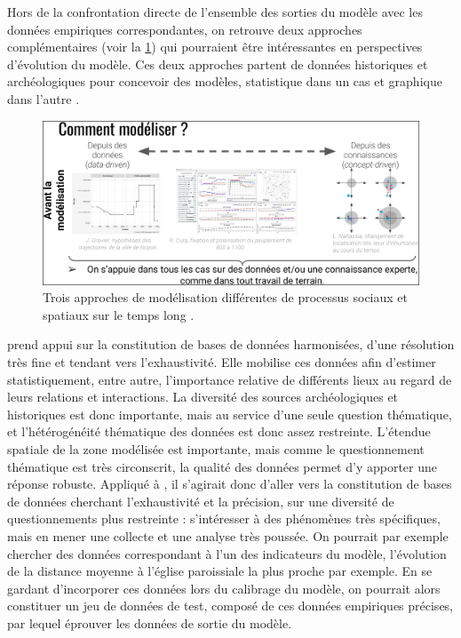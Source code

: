 \noindent Hors de la confrontation directe de l'ensemble des sorties du modèle avec les données empiriques correspondantes, on retrouve deux approches complémentaires (voir la \cref{fig:JIG}) qui pourraient être intéressantes en perspectives d'évolution du modèle.
Ces deux approches partent de données historiques et archéologiques pour concevoir des modèles, statistique dans un cas \autocite{gravier_deux_2018} et graphique dans l'autre \autocite{nahassia_formes_2019}.

\begin{figure}[H]
	\centering
	\includegraphics[width=\linewidth]{img/types_modelisation_JIG.png}
	
	\caption[Trois approches de modélisation différentes de processus sociaux et spatiaux sur le temps long.]{Trois approches de modélisation différentes de processus sociaux et spatiaux sur le temps long \autocite{cura:halshs-02296147}.}
	\label{fig:JIG}
\end{figure}

\noindent \textcite{gravier_deux_2018} prend appui sur la constitution de bases de données harmonisées, d'une résolution très fine et tendant vers l'exhaustivité.
Elle mobilise ces données afin d'estimer statistiquement, entre autre, l'importance relative de différents lieux au regard de leurs relations et interactions.
La diversité des sources archéologiques et historiques est donc importante, mais au service d'une seule question thématique, et l'hétérogénéité thématique des données est donc assez restreinte.
L'étendue spatiale de la zone modélisée est importante, mais comme le questionnement thématique est très circonscrit, la qualité des données permet d'y apporter une réponse robuste.
Appliqué à \simfeodal{}, il s'agirait donc d'aller vers la constitution de bases de données cherchant l'exhaustivité et la précision, sur une diversité de questionnements plus restreinte :
	s'intéresser à des phénomènes très spécifiques, mais en mener une collecte et une analyse très poussée.
On pourrait par exemple chercher des données correspondant à l'un des indicateurs du modèle, l'évolution de la distance moyenne à l'église paroissiale la plus proche par exemple.
En se gardant d'incorporer ces données lors du calibrage du modèle, on pourrait alors constituer un jeu de données de test, composé de ces données empiriques précises, par lequel éprouver les données de sortie du modèle.

